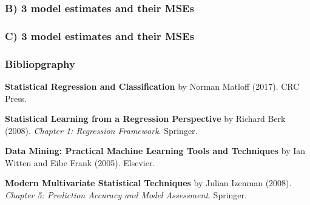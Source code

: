 \documentclass[12pt]{beamer}\usepackage[]{graphicx}\usepackage[]{color}
\begin{document}

\begin{frame}
\frametitle{B) 3 model estimates and their MSEs}
\begin{center}
\end{center}
\end{frame}


\begin{frame}
\frametitle{C) 3 model estimates and their MSEs}
\begin{center}
\end{center}
\end{frame}


\begin{frame}
\begin{center}
\end{center}
\end{frame}


\begin{frame}
\frametitle{Bibliopgraphy}

{\footnotesize
\bi
  \item \textbf{Statistical Regression and Classification} by Norman Matloff (2017).
  CRC Press.
  \item \textbf{Statistical Learning from a Regression Perspective} by Richard Berk (2008). 
  \textit{Chapter 1: Regression Framework}. Springer.
  \item \textbf{Data Mining: Practical Machine Learning Tools and Techniques} by Ian Witten and Eibe Frank (2005).
  Elsevier.
  \item \textbf{Modern Multivariate Statistical Techniques} by Julian Izenman (2008). 
  \textit{Chapter 5: Prediction Accuracy and Model Assessment}. Springer.
\ei
}

\end{frame}

\end{document}
